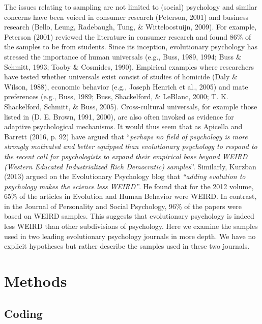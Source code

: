 \documentclass[english,man]{apa6}
\theoremstyle{definition}
\theoremstyle{definition}
\theoremstyle{remark}
\begin{document}
The issues relating to sampling are not limited to (social) psychology
and similar concerns have been voiced in consumer research (Peterson,
2001) and business research (Bello, Leung, Radebaugh, Tung, \&
Witteloostuijn, 2009). For example, Peterson (2001) reviewed the
literature in consumer research and found 86\% of the samples to be from
students. Since its inception, evolutionary psychology has stressed the
importance of human universals (e.g., Buss, 1989, 1994; Buss \& Schmitt,
1993; Tooby \& Cosmides, 1990). Empirical examples where researchers
have tested whether universals exist consist of studies of homicide
(Daly \& Wilson, 1988), economic behavior (e.g., Joseph Henrich et al.,
2005) and mate preferences (e.g., Buss, 1989; Buss, Shackelford, \&
LeBlanc, 2000; T. K. Shackelford, Schmitt, \& Buss, 2005).
Cross-cultural universals, for example those listed in (D. E. Brown,
1991, 2000), are also often invoked as evidence for adaptive
psychological mechanisms. It would thus seem that as Apicella and
Barrett (2016, p. 92) have argued that \enquote{\emph{perhaps no field
of psychology is more strongly motivated and better equipped than
evolutionary psychology to respond to the recent call for psychologists
to expand their empirical base beyond WEIRD (Western Educated
Industrialized Rich Democratic) samples}}. Similarly, Kurzban (2013)
argued on the Evolutionary Psychology blog that \emph{\enquote{adding
evolution to psychology makes the science less WEIRD}}. He found that
for the 2012 volume, 65\% of the articles in Evolution and Human
Behavior were WEIRD. In contrast, in the Journal of Personality and
Social Psychology, 96\% of the papers were based on WEIRD samples. This
suggests that evolutionary psychology is indeed less WEIRD than other
subdivisions of psychology. Here we examine the samples used in two
leading evolutionary psychology journals in more depth. We have no
explicit hypotheses but rather describe the samples used in these two
journals.

\section{Methods}\label{methods}

\subsection{Coding}\label{coding}
\end{document}
